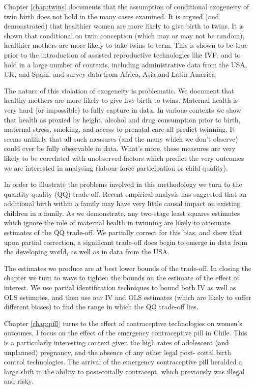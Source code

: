 Chapter \ref{chap:twins} documents that the assumption of conditional 
exogeneity of twin birth does not hold in the many cases examined.  It is 
argued (and demonstrated) that healthier women are more likely to give birth 
to twins.  It is shown that conditional on twin conception (which may or may 
not be random), healthier mothers are more likely to take twins to term. This 
is shown to be true prior to the introduction of assisted reproductive 
technologies like IVF, and to hold in a large number of contexts, including 
administrative data from the USA, UK, and Spain, and  survey data from Africa, 
Asia and Latin America.

The nature of this violation of exogeneity is problematic.  We document that
healthy mothers are more likely to give live birth to twins.  Maternal health
is very hard (or impossible) to fully capture in data.  In various contexts
we show that health as proxied by height, alcohol and drug consumption prior
to birth, maternal stress, smoking, and access to prenatal care all predict
twinning.  It seems unlikely that all such measures (and the many which we
don't observe) could ever be fully observable in data.  What's more, these
measures are very likely to be correlated with unobserved factors which predict
the very outcomes we are interested in analysing (labour force participation
or child quality).

In order to illustrate the problems involved in this methodology we turn to
the quantity-quality (QQ) trade-off.  Recent empirical analysis has suggested 
that an additional birth within a family may have very little causal impact 
on existing children in a family.  As we demonstrate, any two-stage least 
squares estimates which ignore the role of maternal health in twinning are
likely to attenuate estimates of the QQ trade-off.  We partially correct for
this bias, and show that upon partial correction, a significant trade-off
does begin to emerge in data from the developing world, as well as in data
from the USA.

The estimates we produce are at best lower bounds of the trade-off. In closing
the chapter we turn to ways to tighten the bounds on the estimate of the effect 
of interest.  We use partial identification techniques to bound both IV as well 
as OLS estimates, and then use our IV and OLS estimates (which are likely to 
suffer different biases) to find the range in which the QQ trade-off lies.

Chapter \ref{chap:pill} turns to the effect of contraceptive technologies on 
women's outcomes.  I focus on the effect of the emergency contraceptive pill in
Chile.  This is a particularly interesting context given the high rates of 
adolescent (and unplanned) pregnancy, and the absence of any other legal post-%
coital birth control technologies.  The arrival of the emergency contraceptive
pill heralded a large shift in the ability to post-coitally contracept, which
previously was illegal and risky.

